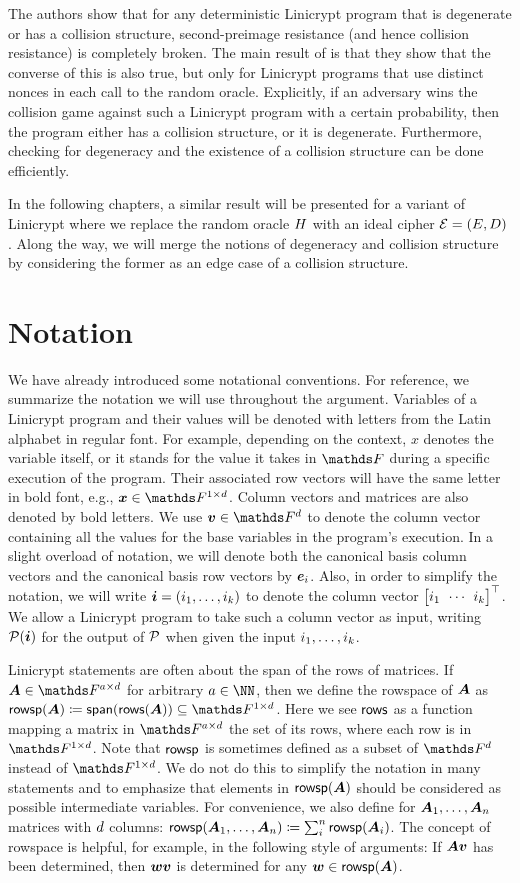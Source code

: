 The authors show that for any deterministic Linicrypt program that is degenerate or has a collision structure,
second-preimage resistance (and hence collision resistance) is completely broken.
The main result of \cite{C:CarRos16} is that they show that the converse of this is also true,
but only for Linicrypt programs that use distinct nonces in each call to the random oracle.
Explicitly, if an adversary wins the collision game against such a Linicrypt program with a certain probability,
then the program either has a collision structure, or it is degenerate.
Furthermore, checking for degeneracy and the existence of a collision structure can be done efficiently.

In the following chapters, a similar result will be presented for a variant of Linicrypt where we replace the random oracle $\H$ with an ideal cipher $\BC=(\E, \D)$.
Along the way,
we will merge the notions of degeneracy and collision structure by considering the former as an edge case of a collision structure.

\section{Notation}
We have already introduced some notational conventions.
For reference, we summarize the notation we will use throughout the argument.
Variables of a Linicrypt program and their values will be denoted with letters from the Latin alphabet in regular font.
For example, depending on the context, $x$ denotes the variable itself,
or it stands for the value it takes in $\F$ during a specific execution of the program.
Their associated row vectors will have the same letter in bold font, e.g., $\vx \in \Frowsp$.
Column vectors and matrices are also denoted by bold letters.
We use $\vv \in \Fsp$ to denote the column vector containing all the values for the base variables in the program's execution.
In a slight overload of notation,
we will denote both the canonical basis column vectors and the canonical basis row vectors by $\ve_i$.
Also, in order to simplify the notation,
we will write $\vi = (i_1, \dots, i_k)$ to denote the column vector $\m{i_1 & \cdots & i_k}^\top$.
We allow a Linicrypt program to take such a column vector as input,
writing $\P(\vi)$ for the output of $\P$ when given the input $\dts i k$. 

Linicrypt statements are often about the span of the rows of matrices.
If $\v A \in \F^{a\times\base}$ for arbitrary $a \in \NN$,
then we define the rowspace of $\v A$ as $\rowsp(\v A) \coloneqq \spn(\rows(\v A)) \subseteq \Frowsp$.
Here we see $\rows$ as a function mapping a matrix in $\F^{a\times\base}$ the set of its rows, where each row is in $\Frowsp$.
Note that $\rowsp$ is sometimes defined as a subset of $\Fsp$ instead of $\Frowsp$.
We do not do this to simplify the notation in many statements
and to emphasize that elements in $\rowsp(\v A)$ should be considered as possible intermediate variables.
For convenience, we also define for $\dts{\v A}{n}$ matrices with $\base$ columns:
$\rowsp(\dts{\v A}{n}) \coloneqq \sum_i^n \rowsp(\v A_i)$.
The concept of rowspace is helpful, for example, in the following style of arguments:
If $\v A\vv$ has been determined, then $\vw\vv$ is determined for any $\vw \in \rowsp(\v A)$.

